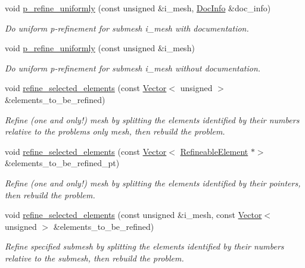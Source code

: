 \begin{DoxyCompactItemize}
void \hyperlink{classoomph_1_1Problem_a04fed27f341b9eb68b5fb3e4673f26f9}{p\+\_\+refine\+\_\+uniformly} (const unsigned \&i\+\_\+mesh, \hyperlink{classoomph_1_1DocInfo}{Doc\+Info} \&doc\+\_\+info)
\begin{DoxyCompactList}\small\item\em Do uniform p-\/refinement for submesh i\+\_\+mesh with documentation. \end{DoxyCompactList}\item 
void \hyperlink{classoomph_1_1Problem_a33dbab01dfa53e4d005818a2940085b0}{p\+\_\+refine\+\_\+uniformly} (const unsigned \&i\+\_\+mesh)
\begin{DoxyCompactList}\small\item\em Do uniform p-\/refinement for submesh i\+\_\+mesh without documentation. \end{DoxyCompactList}\item 
void \hyperlink{classoomph_1_1Problem_a88bfce034f5b054e78a1c1a15d196aeb}{refine\+\_\+selected\+\_\+elements} (const \hyperlink{classoomph_1_1Vector}{Vector}$<$ unsigned $>$ \&elements\+\_\+to\+\_\+be\+\_\+refined)
\begin{DoxyCompactList}\small\item\em Refine (one and only!) mesh by splitting the elements identified by their numbers relative to the problems\textquotesingle{} only mesh, then rebuild the problem. \end{DoxyCompactList}\item 
void \hyperlink{classoomph_1_1Problem_a986b77123d4bb4e4d2fd94aacd627a83}{refine\+\_\+selected\+\_\+elements} (const \hyperlink{classoomph_1_1Vector}{Vector}$<$ \hyperlink{classoomph_1_1RefineableElement}{Refineable\+Element} $\ast$$>$ \&elements\+\_\+to\+\_\+be\+\_\+refined\+\_\+pt)
\begin{DoxyCompactList}\small\item\em Refine (one and only!) mesh by splitting the elements identified by their pointers, then rebuild the problem. \end{DoxyCompactList}\item 
void \hyperlink{classoomph_1_1Problem_af2bd42a9612a31041b9d607340c6d68c}{refine\+\_\+selected\+\_\+elements} (const unsigned \&i\+\_\+mesh, const \hyperlink{classoomph_1_1Vector}{Vector}$<$ unsigned $>$ \&elements\+\_\+to\+\_\+be\+\_\+refined)
\begin{DoxyCompactList}\small\item\em Refine specified submesh by splitting the elements identified by their numbers relative to the submesh, then rebuild the problem. \end{DoxyCompactList}\item 
$$
\end{DoxyCompactItemize}
